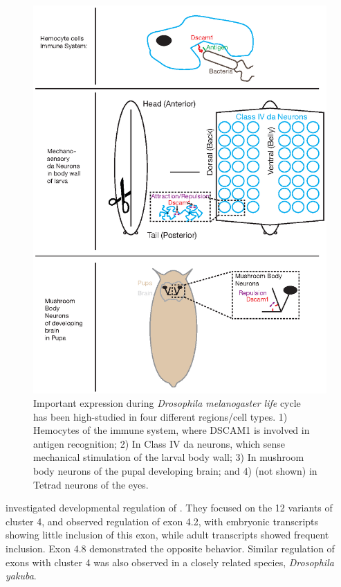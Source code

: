 \begin{figure}[htbp]
	\centering 
	\includegraphics{Figures/Chapter1/DscamAnatomy.eps}
	\caption[Important \dscam{} expression during \flies{} life cycle]
	{
		Important \dscam{} expression during \textit{Drosophila melanogaster life} cycle\\[0.25cm]
		\dscam{} has been high-studied in four different regions/cell types. 1) Hemocytes of the immune system, where DSCAM1 is involved in antigen recognition; 2) In Class IV da neurons, which sense mechanical stimulation of the larval body wall; 3) In mushroom body neurons of the pupal developing brain; and 4) (not shown) in Tetrad neurons of the eyes.
	}
	\label{fig:DscamAnatomy}
\end{figure}


\citet{Celotto2001} investigated developmental regulation of \dscam{}. They focused on the 12 variants of cluster 4, and observed regulation of exon 4.2, with embryonic transcripts showing little inclusion of this exon, while adult transcripts showed frequent inclusion. Exon 4.8 demonstrated the opposite behavior. Similar regulation of exons with cluster 4 was also observed in a closely related species, \textit{Drosophila yakuba}. 

